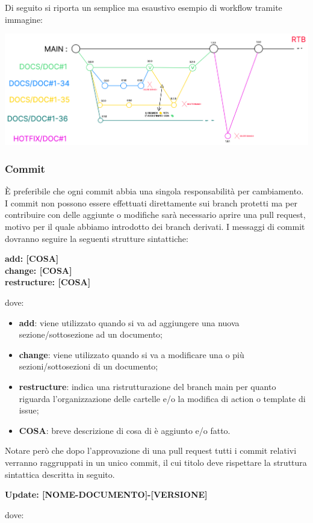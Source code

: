 Di seguito si riporta un semplice ma esaustivo esempio di workflow tramite
immagine:
\begin{center}
      \includegraphics[scale = 0.33]{template/images/workflow.png}
\end{center}

\subsubsection{Commit}\label{inf:comm}
È preferibile che ogni commit abbia una singola responsabilità per cambiamento.
I commit non possono essere effettuati direttamente sui branch protetti ma per contribuire con delle aggiunte o
modifiche sarà necessario aprire una pull request, motivo per il quale abbiamo introdotto dei branch derivati.
I messaggi di commit dovranno seguire la seguenti strutture sintattiche:
\begin{center}
      \textbf{add: [COSA]\\
      change: [COSA]\\
      restructure: [COSA]}
\end{center}
dove:
\begin{itemize}
      \item \textbf{add}: viene utilizzato quando si va ad aggiungere una nuova sezione/sottosezione ad un documento;
      \item \textbf{change}: viene utilizzato quando si va a modificare una o più sezioni/sottosezioni di un documento;
      \item \textbf{restructure}: indica una ristrutturazione del branch main per quanto riguarda l'organizzazione delle cartelle e/o la modifica di action o template di issue;
      \item \textbf{COSA}: breve descrizione di cosa di è aggiunto e/o fatto.
\end{itemize}

Notare però che dopo l'approvazione di una pull request tutti i commit relativi
verranno raggruppati in un unico commit, il cui titolo deve rispettare la
struttura sintattica descritta in seguito.
\begin{center}
      \textbf{Update: [NOME-DOCUMENTO]-[VERSIONE]}
\end{center}
dove:


